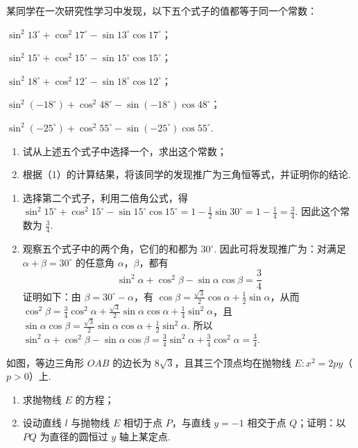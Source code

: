 \begin{problem}
某同学在一次研究性学习中发现，以下五个式子的值都等于同一个常数：
\begin{circlelist}
\item \( \sin^{2}13^{\circ}+\cos^{2}17^{\circ}-\sin13^{\circ}\cos17^{\circ} \)；
\item \( \sin^{2}15^{\circ}+\cos^{2}15^{\circ}-\sin15^{\circ}\cos15^{\circ} \)；
\item \( \sin^{2}18^{\circ}+\cos^{2}12^{\circ}-\sin18^{\circ}\cos12^{\circ} \)；
\item \( \sin^{2}(-18^{\circ})+\cos^{2}48^{\circ}-\sin(-18^{\circ})\cos48^{\circ} \)；
\item \( \sin^{2}(-25^{\circ})+\cos^{2}55^{\circ}-\sin(-25^{\circ})\cos55^{\circ} \).
\end{circlelist}

\begin{enumerate}
\item 试从上述五个式子中选择一个，求出这个常数；
\item 根据（1）的计算结果，将该同学的发现推广为三角恒等式，并证明你的结论.
\end{enumerate}
\end{problem}

\begin{solution}
\begin{enumerate}
\item 选择第二个式子，利用二倍角公式，得 \(\sin^2 15^{\circ}+\cos^2 15^{\circ}-\sin15^{\circ}\cos15^{\circ}=1-\frac12\sin30^{\circ}=1-\frac14=\frac34\). 因此这个常数为 \(\frac34\).
\item 观察五个式子中的两个角，它们的和都为 \(30^{\circ}\). 因此可将发现推广为：对满足 \(\alpha+\beta=30^{\circ}\) 的任意角 \(\alpha\)，\(\beta\)，都有
\[
\sin^2\alpha+\cos^2\beta-\sin\alpha\cos\beta=\frac34
\]
证明如下：由 \(\beta=30^{\circ}-\alpha\)，有 \(\cos\beta=\frac{\sqrt{3}}{2}\cos\alpha+\frac12\sin\alpha\)，从而 \(\cos^2\beta=\frac34\cos^2\alpha+\frac{\sqrt{3}}2\sin\alpha\cos\alpha+\frac14\sin^2\alpha\)，且 \(\sin\alpha\cos\beta=\frac{\sqrt{3}}2\sin\alpha\cos\alpha+\frac12\sin^2\alpha\). 所以 \(\sin^2\alpha+\cos^2\beta-\sin\alpha\cos\beta=\frac34\sin^2\alpha+\frac34\cos^2\alpha=\frac34\).
\end{enumerate}
\end{solution}

\begin{problem}
如图，等边三角形 \(OAB\) 的边长为 \(8\sqrt{3}\)，且其三个顶点均在抛物线 \(E: x^{2} = 2py\)（\(p > 0\)）上.
\begin{enumerate}
\item 求抛物线 \(E\) 的方程；
\item 设动直线 \(l\) 与抛物线 \(E\) 相切于点 \(P\)，与直线 \(y=-1\) 相交于点 \(Q\)；证明：以 \(PQ\) 为直径的圆恒过 \(y\) 轴上某定点.
\end{enumerate}

\end{problem}

